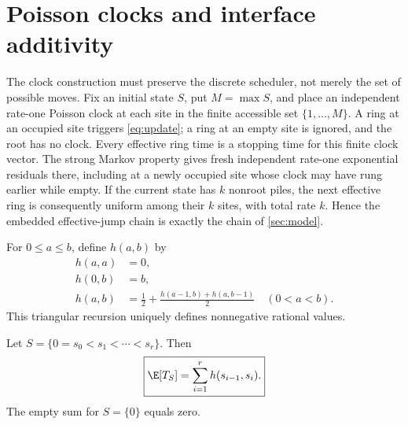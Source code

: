 \section{Poisson clocks and interface additivity}\label{sec:interfaces}

The clock construction must preserve the discrete scheduler, not merely the
set of possible moves.  Fix an initial state $S$, put $M=\max S$, and place
an independent rate-one Poisson clock at each site in the finite accessible
set $\{1,\ldots,M\}$.  A ring at an occupied site triggers
\eqref{eq:update}; a ring at an empty site is ignored, and the root has no
clock.  Every effective ring time is a stopping time for this finite clock
vector.  The strong Markov property gives fresh independent rate-one
exponential residuals there, including at a newly occupied site whose clock
may have rung earlier while empty.  If the current state has $k$ nonroot
piles, the next effective ring is consequently uniform among their $k$
sites, with total rate $k$.  Hence the embedded effective-jump chain is
exactly the chain of \cref{sec:model}.

For $0\leq a\leq b$, define $h(a,b)$ by
\begin{align}
 h(a,a)&=0,                                             \label{eq:hdiag}\\
 h(0,b)&=b,                                             \label{eq:hroot}\\
 h(a,b)&=\frac12+
 \frac{h(a-1,b)+h(a,b-1)}2 \quad(0<a<b).               \label{eq:hrec}
\end{align}
This triangular recursion uniquely defines nonnegative rational values.

\begin{theorem}\label{thm:additivity}
Let
$S=\{0=s_0<s_1<\cdots<s_r\}$.  Then
\begin{equation}
 \boxed{\displaystyle
 \E[T_S]=\sum_{i=1}^{r}h(s_{i-1},s_i).}                \label{eq:additivity}
\end{equation}
The empty sum for $S=\{0\}$ equals zero.
\end{theorem}

